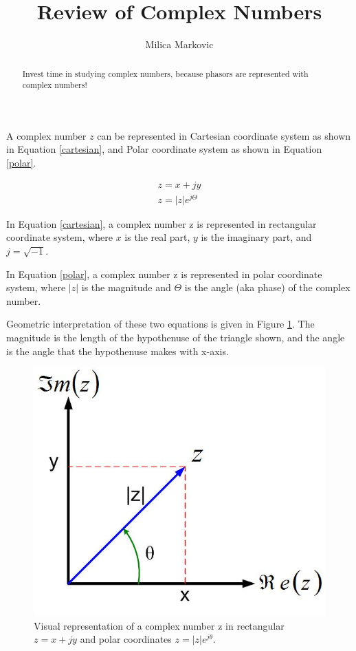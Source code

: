 \documentclass{ximera}
\title{Review of Complex Numbers}
\author{Milica Markovic}
\begin{document}
  
\begin{abstract}  
Invest time in studying complex numbers, because phasors are represented with complex numbers!
\end{abstract}  
\maketitle    
  
  \begin{definition}
 A complex number  $z$ can be represented in Cartesian coordinate system as shown in Equation \ref{cartesian}, and  Polar coordinate system as shown in Equation \ref{polar}. 




\begin{eqnarray}
z= x + j y \label{cartesian} \\ 
z=|z| e^{j \Theta} \label{polar}
\end{eqnarray}

\end{definition}

In Equation \ref{cartesian}, a complex number z is represented in rectangular coordinate system, where $x$ is the real part, $y$ is the imaginary part, and $j=\sqrt{-1}$. 

In Equation \ref{polar}, a complex number z is represented in polar coordinate system, where  $|z|$ is the magnitude and $\Theta$ is the angle (aka phase) of the complex number.

Geometric interpretation of these two equations is given in Figure \ref{wind}. The magnitude is the length of the hypothenuse of the triangle shown, and the angle is the angle that the hypothenuse makes with x-axis. 
\begin{figure}[htbp]
\begin{center}
\includegraphics[scale=0.3]{../jpg/Complex_Numbersz12.jpg}
\end{center}
\caption{Visual representation of a complex number z in rectangular $z=x+jy$ and polar coordinates $z=|z|e^{j \theta}$.}
\label{wind}
\end{figure}
\end{document}
